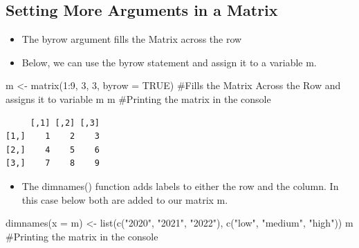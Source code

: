 \documentclass[
  letterpaper,
  DIV=11,
  numbers=noendperiod]{scrreprt}
\newenvironment{Shaded}{\begin{snugshade}}{\end{snugshade}}
\newcommand{\AttributeTok}[1]{\textcolor[rgb]{0.40,0.45,0.13}{#1}}
\newcommand{\CommentTok}[1]{\textcolor[rgb]{0.37,0.37,0.37}{#1}}
\newcommand{\ConstantTok}[1]{\textcolor[rgb]{0.56,0.35,0.01}{#1}}
\newcommand{\DecValTok}[1]{\textcolor[rgb]{0.68,0.00,0.00}{#1}}
\newcommand{\FunctionTok}[1]{\textcolor[rgb]{0.28,0.35,0.67}{#1}}
\newcommand{\NormalTok}[1]{\textcolor[rgb]{0.00,0.23,0.31}{#1}}
\newcommand{\OtherTok}[1]{\textcolor[rgb]{0.00,0.23,0.31}{#1}}
\newcommand{\SpecialCharTok}[1]{\textcolor[rgb]{0.37,0.37,0.37}{#1}}
\newcommand{\StringTok}[1]{\textcolor[rgb]{0.13,0.47,0.30}{#1}}
\providecommand{\tightlist}{%
  \setlength{\itemsep}{0pt}\setlength{\parskip}{0pt}}\usepackage{longtable,booktabs,array}
\begin{document}
\subsection{Setting More Arguments in a
Matrix}\label{setting-more-arguments-in-a-matrix}

\begin{itemize}
\tightlist
\item
  The byrow argument fills the Matrix across the row
\item
  Below, we can use the byrow statement and assign it to a variable m.
\end{itemize}

\begin{Shaded}
\begin{Highlighting}[]
\NormalTok{m }\OtherTok{\textless{}{-}} \FunctionTok{matrix}\NormalTok{(}\DecValTok{1}\SpecialCharTok{:}\DecValTok{9}\NormalTok{, }\DecValTok{3}\NormalTok{, }\DecValTok{3}\NormalTok{, }\AttributeTok{byrow =} \ConstantTok{TRUE}\NormalTok{)  }\CommentTok{\#Fills the Matrix Across the Row and assigns it to variable m}
\NormalTok{m  }\CommentTok{\#Printing the matrix in the console}
\end{Highlighting}
\end{Shaded}

\begin{verbatim}
     [,1] [,2] [,3]
[1,]    1    2    3
[2,]    4    5    6
[3,]    7    8    9
\end{verbatim}

\begin{itemize}
\tightlist
\item
  The dimnames() function adds labels to either the row and the column.
  In this case below both are added to our matrix m.
\end{itemize}

\begin{Shaded}
\begin{Highlighting}[]
\FunctionTok{dimnames}\NormalTok{(}\AttributeTok{x =}\NormalTok{ m) }\OtherTok{\textless{}{-}} \FunctionTok{list}\NormalTok{(}\FunctionTok{c}\NormalTok{(}\StringTok{"2020"}\NormalTok{, }\StringTok{"2021"}\NormalTok{, }\StringTok{"2022"}\NormalTok{), }\FunctionTok{c}\NormalTok{(}\StringTok{"low"}\NormalTok{, }\StringTok{"medium"}\NormalTok{, }\StringTok{"high"}\NormalTok{))}
\NormalTok{m  }\CommentTok{\#Printing the matrix in the console}
\end{Highlighting}
\end{Shaded}
\end{document}
